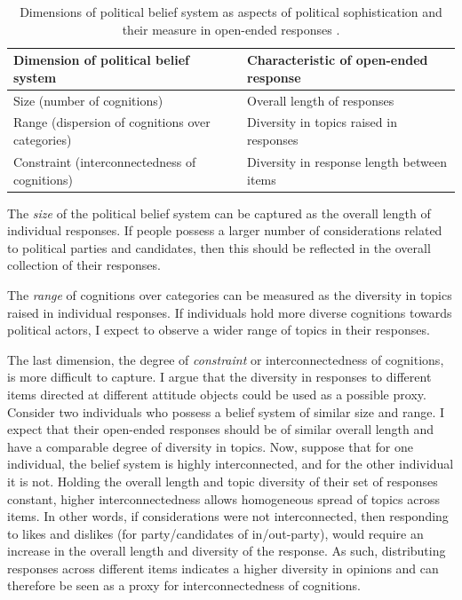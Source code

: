 \documentclass[12pt]{article}
\begin{document}
\begin{table}[h]
\begin{tabularx}{\textwidth}{lX}
\hline 
Dimension of political belief system & Characteristic of open-ended response \\
\hline
Size (number of cognitions) & Overall length of responses \\
Range (dispersion of cognitions over categories) & Diversity in topics raised in responses \\
Constraint (interconnectedness of cognitions) & Diversity in response length between items \\
\hline
\end{tabularx}
\caption{Dimensions of political belief system as aspects of political sophistication and their measure in open-ended responses \citep[c.f.][]{luskin1987measuring}.}\label{tab:measure}
\end{table}

The \textsl{size} of the political belief system can be captured as the overall length of individual responses. If people possess a larger number of considerations related to political parties and candidates, then this should be reflected in the  overall collection of their responses.

The \textsl{range} of cognitions over categories can be measured as the diversity in topics raised in individual responses. If individuals hold more diverse cognitions towards political actors, I expect to observe a wider range of topics in their responses.

The last dimension, the degree of \textsl{constraint} or interconnectedness of cognitions, is more difficult to capture. I argue that the diversity in responses to different items directed at different attitude objects could be used as a possible proxy. Consider two individuals who possess a belief system of similar size and range. I expect that their open-ended responses should be of similar overall length and have a comparable degree of diversity in topics. Now, suppose that for one individual, the belief system is highly interconnected, and for the other individual it is not. Holding the overall length and topic diversity of their set of responses constant, higher interconnectedness allows homogeneous spread of topics across items. In other words, if considerations were not interconnected, then responding to likes and dislikes (for party/candidates of in/out-party), would require an increase in the overall length and diversity of the response. As such, distributing responses across different items indicates a higher diversity in opinions and can therefore be seen as a proxy for interconnectedness of cognitions.
\end{document}
